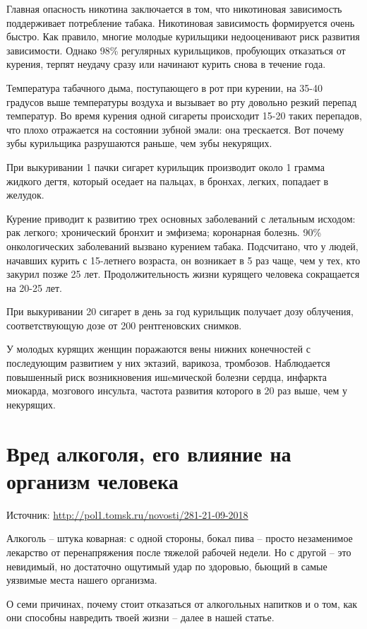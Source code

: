 Главная опасность никотина заключается в том, что никотиновая зависимость поддерживает потребление табака. Никотиновая зависимость формируется очень быстро. Как правило, многие молодые курильщики недооценивают риск развития зависимости. Однако 98\% регулярных курильщиков, пробующих отказаться от курения, терпят неудачу сразу или начинают курить снова в течение года.

Температура табачного дыма, поступающего в рот при курении, на 35-40 градусов выше температуры воздуха и вызывает во рту довольно резкий перепад температур. Во время курения одной сигареты происходит 15-20 таких перепадов, что плохо отражается на состоянии зубной эмали: она трескается. Вот почему зубы курильщика разрушаются раньше, чем зубы некурящих.

При выкуривании 1 пачки сигарет курильщик производит около 1 грамма жидкого дегтя, который оседает на пальцах, в бронхах, легких, попадает в желудок.

Курение приводит к развитию трех основных заболеваний с летальным исходом: рак легкого; хронический бронхит и эмфизема; коронарная болезнь. 90\% онкологических заболеваний вызвано курением табака. Подсчитано, что у людей, начавших курить с 15-летнего возраста, он возникает в 5 раз чаще, чем у тех, кто закурил позже 25 лет. Продолжительность жизни курящего человека сокращается на 20-25 лет.

При выкуривании 20 сигарет в день за год курильщик получает дозу облучения, соответствующую дозе от 200 рентгеновских снимков.

У молодых курящих женщин поражаются вены нижних конечностей с последующим развитием у них эктазий, варикоза, тромбозов. Наблюдается повышенный риск возникновения ишeмической болезни сердца, инфаркта миокарда, мозгового инсульта, частота развития которого в 20 раз выше, чем у некурящих.


\section{Вред алкоголя, его влияние на организм человека }

Источник: \url{http://pol1.tomsk.ru/novosti/281-21-09-2018}

Алкоголь – штука коварная: с одной стороны, бокал пива – просто незаменимое лекарство от перенапряжения после тяжелой рабочей недели. Но с другой – это невидимый, но достаточно ощутимый удар по здоровью, бьющий в самые уязвимые места нашего организма.

О семи причинах, почему стоит отказаться от алкогольных напитков и о том, как они способны навредить твоей жизни – далее в нашей статье.

